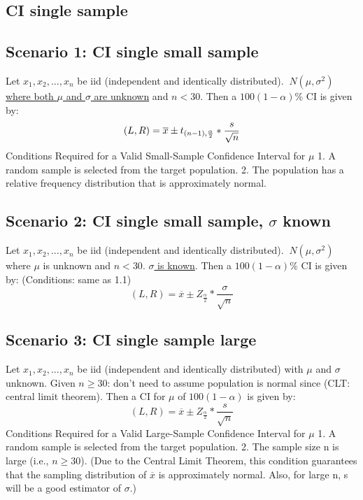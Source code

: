 \documentclass[fontsize=6pt, paper=a4]{scrartcl}
\begin{document}
\begin{multicols*}{4}
\tiny{
\section{CI single sample}
\subsection{Scenario 1: CI single small sample}
Let $x_1,x_2,...,x_n$ be iid (independent and identically distributed). $~N(\mu, \sigma^2)$ \underline{where both $\mu$ and $\sigma$ are unknown} and \underline{$n<30$}. Then a $100(1-\alpha)\%$ CI is given by:
\begin{equation}
    (L,R)=\overline{x}\pm \\t_{(n-1),\frac{\alpha}{2}}*\frac{s}{\sqrt{n}}
\end{equation}
Conditions Required for a Valid Small-Sample Confidence Interval for $\mu$
1. A random sample is selected from the target population.
2. The population has a relative frequency distribution that is approximately normal.
\subsection{Scenario 2: CI single small sample, $\sigma$ known}
Let $x_1,x_2,...,x_n$ be iid (independent and identically distributed). $~N(\mu, \sigma^2)$ where $\mu$ is unknown and \underline{$n<30$}. \underline{$\sigma$ is known}. Then a $100(1-\alpha)\%$ CI is given by: (Conditions: same as 1.1)
\begin{equation}
	(L,R)= \overline{x}\pm Z_{\frac{\alpha}{2}}*\frac{\sigma}{\sqrt{n}}
\end{equation}
\subsection{Scenario 3: CI single sample large}
Let $x_1,x_2,...,x_n$ be iid (independent and identically distributed) with $\mu$ and $\sigma$ unknown. Given \underline{$n \geq 30$}: don't need to assume population is normal since (CLT: central limit theorem). Then a CI for $\mu$ of $100(1-\alpha)$ is given by:
\begin{equation}
	(L,R)=\overline{x}\pm Z_{\frac{\alpha}{2}}*\frac{s}{\sqrt{n}}
\end{equation}
Conditions Required for a Valid Large-Sample Confidence Interval for $\mu$
1. A random sample is selected from the target population.
2. The sample size n is large (i.e., $n \geq 30$). (Due to the Central Limit Theorem, this condition guarantees that the sampling distribution of $\overline{x}$ is approximately normal. Also, for large n, s will be a good estimator of $\sigma$.)

}
\end{multicols*}
\end{document}

